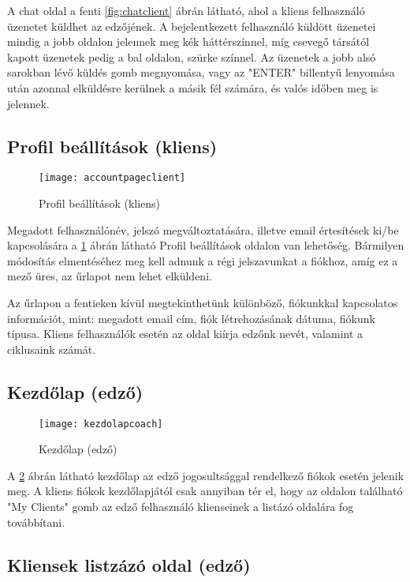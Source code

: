 A chat oldal a fenti \ref{fig:chatclient} ábrán látható, ahol a kliens felhasználó üzenetet küldhet az edzőjének. A bejelentkezett felhasználó küldött üzenetei mindig a jobb oldalon jelennek meg kék háttérszínnel, míg csevegő társától kapott üzenetek pedig a bal oldalon, szürke színnel. Az üzenetek a jobb alsó sarokban lévő küldés gomb megnyomása, vagy az "ENTER" billentyű lenyomása után azonnal elküldésre kerülnek a másik fél számára, és valós időben meg is jelennek.

\subsection{Profil beállítások (kliens)}

\begin{figure}[H]
	\centering
	\texttt{[image: accountpageclient]}
	\caption{Profil beállítások (kliens)}
	\label{fig:accountpageclient}
\end{figure}

Megadott felhasználónév, jelszó megváltoztatására, illetve email értesítések ki/be kapcsolására a \ref{fig:accountpageclient} ábrán látható Profil beállítások oldalon van lehetőség. Bármilyen módosítás elmentéséhez meg kell adnunk a régi jelszavunkat a fiókhoz, amíg ez a mező üres, az űrlapot nem lehet elküldeni.

Az űrlapon a fentieken kívül megtekinthetünk különböző, fiókunkkal kapcsolatos információt, mint: megadott email cím, fiók létrehozásának dátuma, fiókunk típusa. Kliens felhasználók esetén az oldal kiírja edzőnk nevét, valamint a ciklusaink számát.

\subsection{Kezdőlap (edző)}

\begin{figure}[H]
	\centering
	\texttt{[image: kezdolapcoach]}
	\caption{Kezdőlap (edző)}
	\label{fig:kezdolapcoach}
\end{figure}

A \ref{fig:kezdolapcoach} ábrán látható kezdőlap az edző jogosultsággal rendelkező fiókok esetén jelenik meg. A kliens fiókok kezdőlapjától csak annyiban tér el, hogy az oldalon található "My Clients" gomb az edző felhasználó klienseinek a listázó oldalára fog továbbítani.

\subsection{Kliensek listzázó oldal (edző)}

